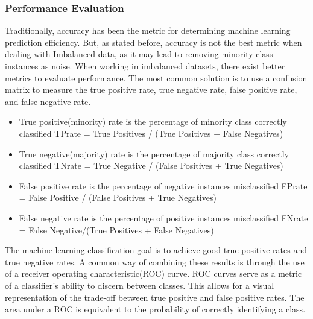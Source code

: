 \subsubsection{Performance Evaluation}
Traditionally, accuracy has been the metric for determining machine learning prediction efficiency. But, as stated before, accuracy is not the best metric when dealing with Imbalanced data, as it may lead to removing minority class instances as noise. When working in imbalanced datasets, there exist better metrics to evaluate performance. The most common solution is to use a confusion matrix to measure the true positive rate, true negative rate, false positive rate, and false negative rate. 
\begin{itemize}
    \item True positive(minority) rate is the percentage of minority class correctly classified
    \subitem TPrate = True Positives / (True Positives + False Negatives)
    \item True negative(majority) rate is the percentage of majority class correctly classified 
    \subitem TNrate = True Negative / (False Positives + True Negatives)
    \item False positive rate is the percentage of negative instances misclassified
    \subitem FPrate = False Positive / (False Positives + True Negatives)
    \item False negative rate is the percentage of positive instances misclassified
    \subitem FNrate = False Negative/(True Positives + False Negatives)
\end{itemize}
The machine learning classification goal is to achieve good true positive rates and true negative rates. A common way of combining these results is through the use of a receiver operating characteristic(ROC) curve. ROC curves serve as a metric of a classifier's ability to discern between classes. This allows for a visual representation of the trade-off between true positive and false positive rates. The area under a ROC is equivalent to the probability of correctly identifying a class.


